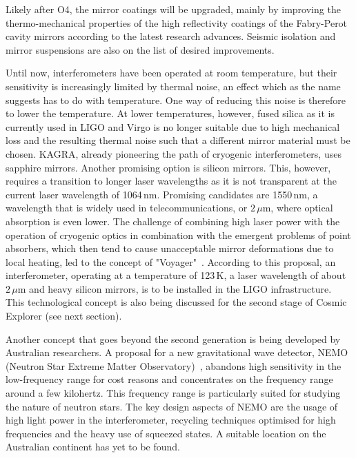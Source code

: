 \documentclass[graybox, nosecnum]{svmult}
\begin{document}
Likely after O4, the mirror coatings will be upgraded, mainly by improving the thermo-mechanical properties of the high reflectivity coatings of the Fabry-Perot cavity mirrors according to the latest research advances. Seismic isolation and mirror suspensions are also on the list of desired improvements.

Until now, interferometers have been operated at room temperature, but their sensitivity is increasingly limited by thermal noise, an effect which as the name suggests has to do with temperature.  One way of reducing this noise is therefore to lower the temperature.  At lower temperatures, however, fused silica as it is currently used in LIGO and Virgo is no longer suitable due to high mechanical loss and the resulting thermal noise such that a different mirror material must be chosen. KAGRA, already pioneering the path of cryogenic interferometers, uses sapphire mirrors. Another promising option is silicon mirrors. This, however, requires a transition to longer laser wavelengths as it is not transparent at the current laser wavelength of 1064\,nm.  Promising candidates are 1550\,nm, a wavelength that is widely used in telecommunications, or \(2\,\mu\)m, where optical absorption is even lower.  The challenge of combining high laser power with the operation of cryogenic optics in combination with the emergent problems of point absorbers, which then tend to cause unacceptable mirror deformations due to local heating, led to the concept of "Voyager"~\cite{Voyager2018}. According to this proposal, an interferometer, operating at a temperature of 123\,K, a laser wavelength of about \(2\,\mu\)m and heavy silicon mirrors, is to be installed in the LIGO infrastructure. This technological concept is also being discussed for the second stage of Cosmic Explorer (see next section).

Another concept that goes beyond the second generation is being developed by Australian researchers. A proposal for a new gravitational wave detector, NEMO (Neutron Star Extreme Matter Observatory)~\cite{NEMO}, abandons high sensitivity in the low-frequency range for cost reasons and concentrates on the frequency range around a few kilohertz. This frequency range is particularly suited for studying the nature of neutron stars. 
The key design aspects of NEMO are the usage of high light power in the interferometer, recycling techniques optimised for high frequencies and the heavy use of squeezed states.
A suitable location on the Australian continent has yet to be found. 
\end{document}
